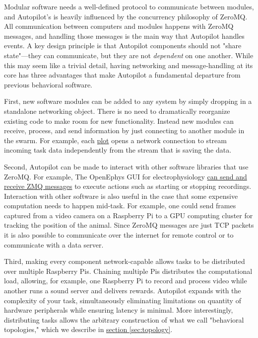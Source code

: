 Modular software needs a well-defined protocol to communicate between modules, and Autopilot's is heavily influenced by the concurrency philosophy of ZeroMQ\citep{hintjensZeroMQMessagingMany2013}. All communication between computers and modules happens with ZeroMQ messages, and handling those messages is the main way that Autopilot handles events. A key design principle is that Autopilot components should not "share state"---they can communicate, but they are not \textit{dependent} on one another. While this may seem like a trivial detail, having networking and message-handling at its core has three advantages that make Autopilot a fundamental departure from previous behavioral software.

First, new software modules can be added to any system by simply dropping in a standalone networking object. There is no need to dramatically reorganize existing code to make room for new functionality. Instead new modules can receive, process, and send information by just connecting to another module in the swarm. For example, each \hyperref[sec:plotting]{plot} opens a network connection to stream incoming task data independently from the stream that is saving the data.

Second, Autopilot can be made to interact with other software libraries that use ZeroMQ. For example, The OpenEphys GUI for electrophysiology \href{https://open-ephys.atlassian.net/wiki/spaces/OEW/pages/23265310/Network+Events}{can send and receive ZMQ messages} to execute actions such as starting or stopping recordings. Interaction with other software is also useful in the case that some expensive computation needs to happen mid-task. For example, one could send frames captured from a video camera on a Raspberry Pi to a GPU computing cluster for tracking the position of the animal. Since ZeroMQ messages are just TCP packets it is also possible to communicate over the internet for remote control or to communicate with a data server.

Third, making every component network-capable allows tasks to be distributed over multiple Raspberry Pis. Chaining multiple Pis distributes the computational load, allowing, for example, one Raspberry Pi to record and process video while another runs a sound server and delivers rewards. Autopilot expands with the complexity of your task, simultaneously eliminating limitations on quantity of hardware peripherals while ensuring latency is minimal. More interestingly, distributing tasks allows the arbitrary construction of what we call "behavioral topologies," which we describe in \hyperref[sec:topology]{section \ref*{sec:topology}}.
